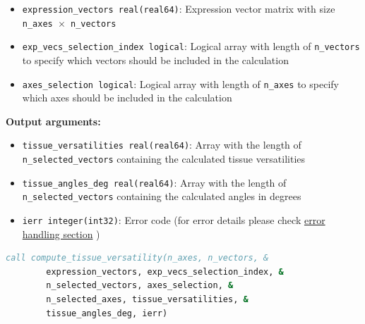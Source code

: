 \begin{enumerate}
\begin{itemize}
            \item \texttt{expression\_vectors real(real64)}: Expression vector matrix
                  with size \texttt{n\_axes $\times$ n\_vectors}
                  
            \item \texttt{exp\_vecs\_selection\_index logical}: Logical array with
                  length of \texttt{n\_vectors} to specify which vectors should be
                  included in the calculation
                  
            \item \texttt{axes\_selection logical}: Logical array with length of
                  \texttt{n\_axes} to specify which axes should be included in the
                  calculation
          \end{itemize}
          
          \textbf{Output arguments:}
          \begin{itemize}
            \item \texttt{tissue\_versatilities real(real64)}: Array with the length
                  of \texttt{n\_selected\_vectors} containing the calculated tissue
                  versatilities
                  
            \item \texttt{tissue\_angles\_deg real(real64)}: Array with the length
                  of \texttt{n\_selected\_vectors} containing the calculated angles
                  in degrees
                  
            \item \texttt{ierr integer(int32)}: Error code (for error details
                  please check \hyperref[sec:error-handling]{error handling section}
                  )
          \end{itemize}
          \begin{lstlisting}[language=Fortran, caption={Tissue Versatility Calculation}]
call compute_tissue_versatility(n_axes, n_vectors, &
        expression_vectors, exp_vecs_selection_index, &
        n_selected_vectors, axes_selection, &
        n_selected_axes, tissue_versatilities, &
        tissue_angles_deg, ierr)
          \end{lstlisting}
\end{enumerate}
